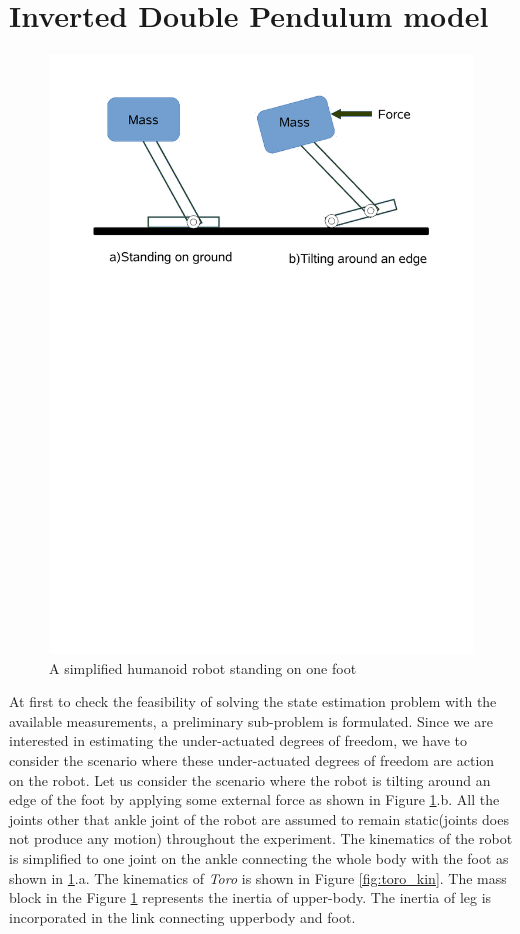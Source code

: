 \section{Inverted Double Pendulum model} 
\begin{figure}[H]
	\centering
	\includegraphics[trim = 0mm 180mm 0mm 10mm, scale=0.50]{Bilder/simp_uactcase.pdf}
	\caption{A simplified humanoid robot standing on one foot}
	\label{fig:idp_scene}
\end{figure}
At first to check the feasibility of solving the state estimation problem with the available measurements, a preliminary sub-problem is formulated. Since we are interested in estimating the under-actuated degrees of freedom, we have to consider the scenario where these under-actuated degrees of freedom are action on the robot. Let us consider the scenario where the robot is tilting around an edge of the foot by applying some external force as shown in Figure \ref{fig:idp_scene}.b. All the joints other that ankle joint of the robot are assumed to remain static(joints does not produce any motion) throughout the experiment. The kinematics of the robot is simplified to one joint on the ankle connecting the whole body with the foot as shown in \ref{fig:idp_scene}.a. The kinematics of \emph{Toro} is shown in Figure \ref{fig:toro_kin}. The mass block in the Figure \ref{fig:idp_scene} represents the inertia of upper-body. The inertia of leg is incorporated in the link connecting upperbody and foot. 

